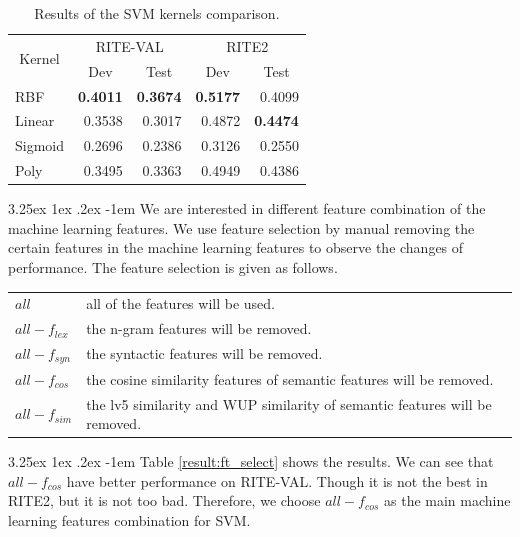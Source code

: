 \documentclass[12pt]{article}
\makeatletter
\renewcommand\paragraph{\@startsection{paragraph}{5}{\z@}%
  {3.25ex \@plus1ex \@minus.2ex}%
  {-1em}%
  {\normalfont\normalsize\bfseries}}
\makeatother
\begin{document}
\begin{CJK*}{UTF8}{bkai}
\begin{spacing}{1.77}
\begin{table}[H]
  \centering
  \setlength{\extrarowheight}{-3pt}
  \caption{Results of the SVM kernels comparison.}
  \label{svm_kernel}
  \begin{tabular}{|l|r|r|r|r|}
  \hline
  \multicolumn{1}{|c|}{\multirow{2}{*}{Kernel}} & \multicolumn{2}{c|}{RITE-VAL} & \multicolumn{2}{c|}{RITE2} \\ \cline{2-5}
  \multicolumn{1}{|c|}{} & \multicolumn{1}{c|}{Dev} & \multicolumn{1}{c|}{Test} & \multicolumn{1}{c|}{Dev} & \multicolumn{1}{c|}{Test} \\ \hline
  RBF & \textbf{0.4011} & \textbf{0.3674} & \textbf{0.5177} & 0.4099 \\ \hline
  Linear & 0.3538 & 0.3017 & 0.4872 & \textbf{0.4474} \\ \hline
  Sigmoid & 0.2696 & 0.2386 & 0.3126 & 0.2550 \\ \hline
  Poly & 0.3495 & 0.3363 & 0.4949 & 0.4386 \\ \hline
  \end{tabular}
\end{table}

\paragraph{}
We are interested in different feature combination of the machine learning features. We use feature selection by manual removing the certain features in the machine learning features to observe the changes of performance. The feature selection is given as follows.

\begin{table}[H]
  \centering
  \setlength{\extrarowheight}{-3pt}
  \begin{tabular}{ll}
    $all$ & all of the features will be used. \\
    $all-f_{lex}$ & the n-gram features will be removed. \\
    $all-f_{syn}$ & the syntactic features will be removed. \\
    $all-f_{cos}$ & the cosine similarity features of semantic features will be removed. \\
    $all-f_{sim}$ & the lv5 similarity and WUP similarity of semantic features will be removed. \\
  \end{tabular}
\end{table}

\paragraph{}
Table \ref{result:ft_select} shows the results. We can see that $all-f_{cos}$ have better performance on RITE-VAL. Though it is not the best in RITE2, but it is not too bad. Therefore, we choose $all-f_{cos}$ as the main machine learning features combination for SVM.


\end{spacing}
\end{CJK*}
\end{document}
